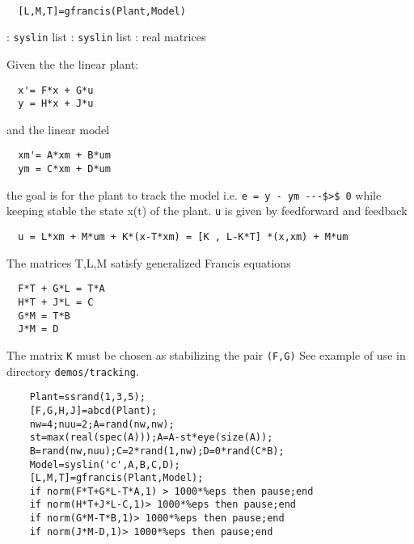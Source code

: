 \begin{mandesc}
   \\ %
\end{mandesc}
\begin{calling_sequence}
\begin{verbatim}
  [L,M,T]=gfrancis(Plant,Model)  
\end{verbatim}
\end{calling_sequence}
\begin{parameters}
  \begin{varlist}
    : \verb!syslin! list
    : \verb!syslin! list
    : real matrices
  \end{varlist}
\end{parameters}
\begin{mandescription}
  Given the the linear plant:
\begin{verbatim}
  x'= F*x + G*u 
  y = H*x + J*u
\end{verbatim}
and the linear model
\begin{verbatim}
  xm'= A*xm + B*um
  ym = C*xm + D*um
\end{verbatim}
the goal is for the plant to track the model i.e. \verb!e = y - ym ---$>$ 0!
while keeping stable the state x(t) of the plant. 
\verb!u! is given by feedforward and feedback
\begin{verbatim}
  u = L*xm + M*um + K*(x-T*xm) = [K , L-K*T] *(x,xm) + M*um
\end{verbatim}
The matrices T,L,M satisfy generalized Francis equations
\begin{verbatim}
  F*T + G*L = T*A
  H*T + J*L = C
  G*M = T*B
  J*M = D
\end{verbatim}
The matrix \verb!K! must be chosen as stabilizing the pair \verb!(F,G)!
See example of use in directory \verb!demos/tracking!.
\end{mandescription}
\begin{examples}
  \begin{Verbatim}
    Plant=ssrand(1,3,5);
    [F,G,H,J]=abcd(Plant);
    nw=4;nuu=2;A=rand(nw,nw);
    st=max(real(spec(A)));A=A-st*eye(size(A));
    B=rand(nw,nuu);C=2*rand(1,nw);D=0*rand(C*B);
    Model=syslin('c',A,B,C,D);
    [L,M,T]=gfrancis(Plant,Model);
    if norm(F*T+G*L-T*A,1) > 1000*%eps then pause;end
    if norm(H*T+J*L-C,1)> 1000*%eps then pause;end
    if norm(G*M-T*B,1)> 1000*%eps then pause;end
    if norm(J*M-D,1)> 1000*%eps then pause;end
  \end{Verbatim}
\end{examples}
\begin{manseealso}
     
\end{manseealso}
